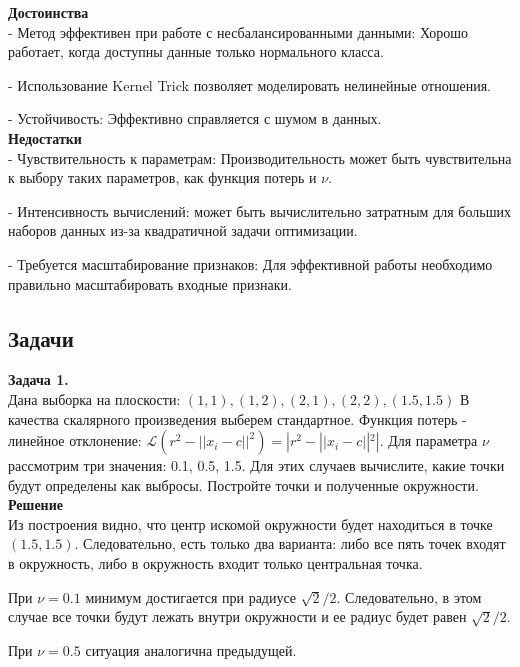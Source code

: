 \textbf{Достоинства} \\

- Метод эффективен при работе с несбалансированными данными: Хорошо работает, когда доступны данные только нормального класса.

- Использование Kernel Trick позволяет моделировать нелинейные отношения.

- Устойчивость: Эффективно справляется с шумом в данных.\\

\textbf{Недостатки} \\

- Чувствительность к параметрам: Производительность может быть чувствительна к выбору таких параметров, как функция потерь и $\nu$.

- Интенсивность вычислений: может быть вычислительно затратным для больших наборов данных из-за квадратичной задачи оптимизации.

- Требуется масштабирование признаков: Для эффективной работы необходимо правильно масштабировать входные признаки.

\subsection{Задачи} 

\textbf{Задача 1.} \\

Дана выборка на плоскости: $(1, 1), (1, 2), (2, 1), (2, 2), (1.5, 1.5)$
В качества скалярного произведения выберем стандартное. Функция потерь - линейное отклонение: $\mathcal{L} (r^2 - ||x_i - c||^2) = |r^2 - ||x_i - c||^2|$. Для параметра $\nu$ рассмотрим три значения: 0.1, 0.5, 1.5. Для этих случаев вычислите, какие точки будут определены как выбросы. Постройте точки и полученные окружности. \\

\textbf{Решение} \\

Из построения видно, что центр искомой окружности будет находиться в точке $(1.5, 1.5)$. Следовательно, есть только два варианта: либо все пять точек входят в окружность, либо в окружность входит только центральная точка.

При $\nu = 0.1$ минимум достигается при радиусе $\sqrt{2} / 2$. Следовательно, в этом случае все точки будут лежать внутри окружности и ее радиус будет равен $\sqrt{2} / 2$.

При $\nu = 0.5$ ситуация аналогична предыдущей.

